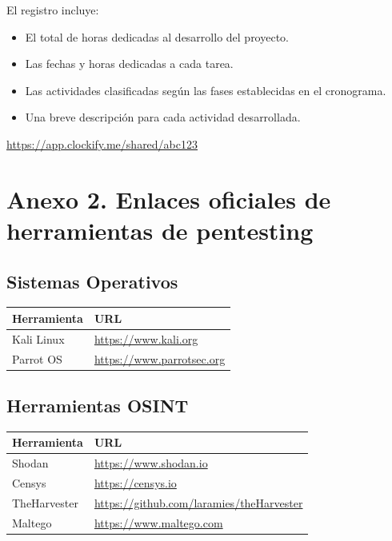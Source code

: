 \documentclass[a4paper, 11pt]{article}
\begin{document}
El registro incluye:
\begin{itemize}
  \item El total de horas dedicadas al desarrollo del proyecto.
  \item Las fechas y horas dedicadas a cada tarea.
  \item Las actividades clasificadas según las fases establecidas en el cronograma.
  \item Una breve descripción para cada actividad desarrollada.
\end{itemize}

\begin{tcolorbox}[enhanced,attach boxed title to top center={yshift=-3mm,yshifttext=-1mm},
  colback=blue!5!white,colframe=blue!75!black,colbacktitle=red!80!black,
  title=Dirección URL,fonttitle=\bfseries,
  boxed title style={size=small,colframe=red!50!black} ]
  \centering
  \url{https://app.clockify.me/shared/abc123}

\end{tcolorbox}


\clearpage
\thispagestyle{nohead}
\section*{Anexo 2. Enlaces oficiales de herramientas de pentesting}
\label{anexo:2}

\subsection*{Sistemas Operativos}
\begin{table}[H]
\centering
\begin{tabular}{|m{5cm}|m{10cm}|}
\hline
\textbf{Herramienta} & \textbf{URL} \\
\hline
Kali Linux & \url{https://www.kali.org} \\
\hline
Parrot OS & \url{https://www.parrotsec.org} \\
\hline
\end{tabular}
\end{table}

\subsection*{Herramientas OSINT}
\begin{table}[H]
\centering
\begin{tabular}{|m{5cm}|m{10cm}|}
\hline
\textbf{Herramienta} & \textbf{URL} \\
\hline
Shodan & \url{https://www.shodan.io} \\
\hline
Censys & \url{https://censys.io} \\
\hline
TheHarvester & \url{https://github.com/laramies/theHarvester} \\
\hline
Maltego & \url{https://www.maltego.com} \\
\hline
\end{tabular}
\end{table}
\end{document}
